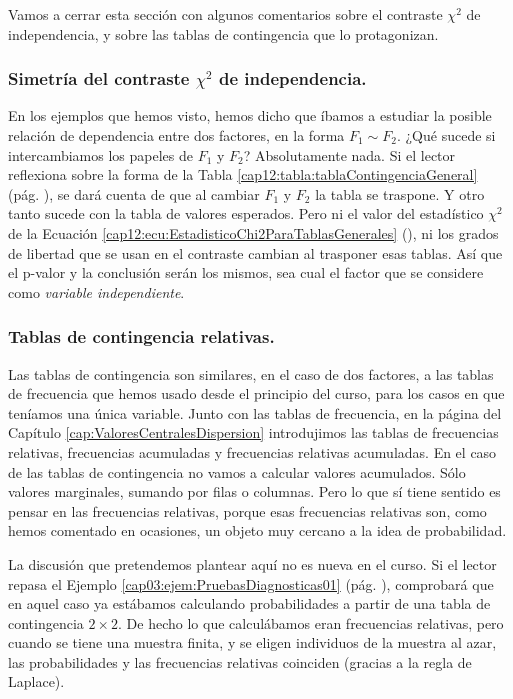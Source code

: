 Vamos a cerrar esta sección con algunos comentarios sobre el contraste $\chi^2$ de independencia, y sobre las tablas de contingencia que lo protagonizan.

\subsubsection*{Simetría del contraste $\chi^2$ de independencia.}

En los ejemplos que hemos visto, hemos dicho que íbamos a estudiar la posible relación de dependencia entre dos factores, en la forma $F_1 \sim F_2$. ¿Qué sucede si intercambiamos los papeles de $F_1$ y $F_2$? Absolutamente nada. Si el lector reflexiona sobre la forma de la Tabla \ref{cap12:tabla:tablaContingenciaGeneral} (pág. \pageref{cap12:tabla:tablaContingenciaGeneral}), se dará cuenta de que al cambiar $F_1$ y $F_2$ la tabla se traspone. Y otro tanto sucede con la tabla de valores esperados. Pero ni el valor del estadístico $\chi^2$ de la Ecuación \ref{cap12:ecu:EstadisticoChi2ParaTablasGenerales} (\pageref{cap12:ecu:EstadisticoChi2ParaTablasGenerales}), ni los grados de libertad que se usan en el contraste cambian al trasponer esas tablas. Así que el p-valor y la conclusión serán los mismos, sea cual el factor que se considere como {\em variable independiente}.

\subsubsection*{Tablas de contingencia relativas.}
\label{cap12:subsubsec:tablasContingenciaRelativas}

Las tablas de contingencia son similares, en el caso de dos factores, a las tablas de frecuencia que hemos usado desde el principio del curso, para los casos en que teníamos una única variable. Junto con las tablas de frecuencia, en la página \pageref{cap02:subsubsec:MedianaTablasFrecuenciasRelativasAcumuladas} del Capítulo \ref{cap:ValoresCentralesDispersion} introdujimos las tablas de frecuencias relativas, frecuencias acumuladas y frecuencias relativas acumuladas. En el caso de las tablas de contingencia no vamos a calcular valores acumulados. Sólo valores marginales, sumando por filas o columnas. Pero lo que sí tiene sentido es pensar en las frecuencias relativas, porque esas frecuencias relativas son, como hemos comentado en ocasiones, un objeto muy cercano a la idea de probabilidad.

La discusión que pretendemos plantear aquí no es nueva en el curso. Si el lector repasa el Ejemplo \ref{cap03:ejem:PruebasDiagnosticas01} (pág. \pageref{cap03:ejem:PruebasDiagnosticas01}), comprobará que en aquel caso ya estábamos calculando probabilidades a partir de una tabla de contingencia $2\times 2$. De hecho lo que calculábamos eran frecuencias relativas, pero cuando se tiene una muestra finita, y se eligen individuos de la muestra al azar, las probabilidades y las frecuencias relativas coinciden (gracias a la regla de Laplace).

